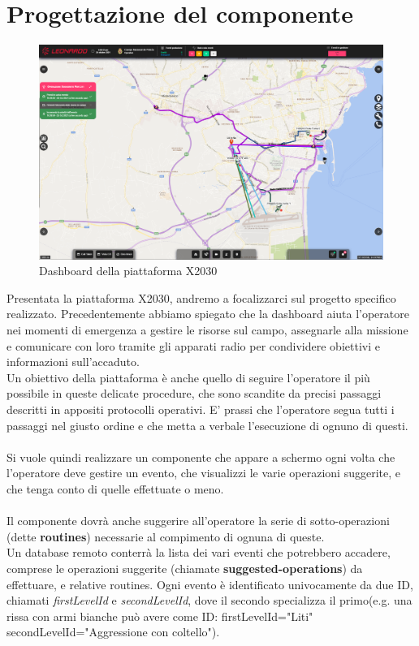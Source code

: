 \pagebreak

\section{Progettazione del componente}
\begin{figure}[H]
    \centering
    \includegraphics[width=140mm]{img/screenshotGUI}
    \caption{Dashboard della piattaforma X2030}
  \end{figure}
Presentata la piattaforma X2030, andremo a focalizzarci sul progetto specifico realizzato.
Precedentemente abbiamo spiegato che la dashboard aiuta l'operatore nei momenti di emergenza a gestire le 
risorse sul campo, assegnarle alla missione e comunicare con loro tramite gli apparati radio per 
condividere obiettivi e informazioni sull'accaduto.\\
Un obiettivo della piattaforma è anche quello di seguire l'operatore il più possibile in 
queste delicate procedure,
che sono scandite da precisi passaggi descritti in appositi protocolli operativi.
E' prassi che l'operatore segua tutti i passaggi nel giusto ordine
e che metta a verbale l'esecuzione di ognuno di questi.
\\\\
Si vuole quindi realizzare un componente che appare a schermo ogni volta che l'operatore deve
 gestire un evento,
che visualizzi le varie operazioni suggerite, e che tenga conto di quelle effettuate o meno.
\\\\
Il componente dovrà anche suggerire all'operatore la serie di sotto-operazioni (dette \textbf{routines}) 
necessarie al compimento di ognuna di queste.
\\
Un database remoto conterrà la lista dei vari eventi che potrebbero accadere, comprese le operazioni 
suggerite (chiamate \textbf{suggested-operations}) da effettuare, e relative routines.
Ogni evento è identificato univocamente da due ID, chiamati \emph{firstLevelId} e \emph{secondLevelId}, 
dove il secondo specializza il primo(e.g. una rissa con armi bianche può avere come ID: firstLevelId="Liti" 
secondLevelId="Aggressione con coltello").



